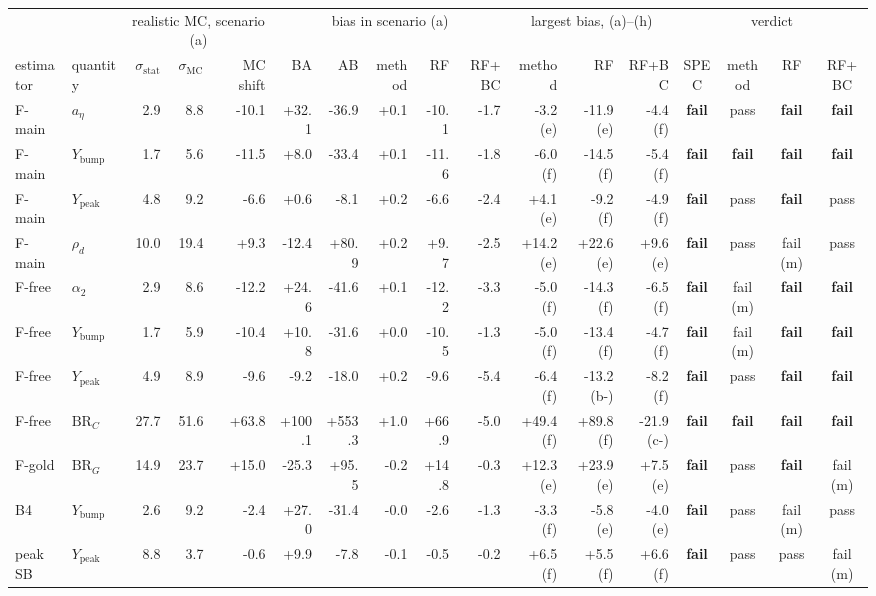 \begin{tabular}{llrrr|rrrrr|rrr|cccc}
\toprule
 & & \multicolumn{3}{c|}{realistic MC, scenario (a)} & \multicolumn{5}{c|}{bias in scenario (a)} & \multicolumn{3}{c|}{largest bias, (a)--(h)} & \multicolumn{4}{c}{verdict} \\
estimator & quantity & $\sigma_\mathrm{stat}$ & $\sigma_\mathrm{MC}$ & MC shift & BA & AB & method & RF & RF+BC & method & RF & RF+BC & SPEC & method & RF & RF+BC \\
\midrule
F-main & $a_\eta$ & 2.9 & 8.8 & -10.1 & +32.1 & -36.9 & +0.1 & -10.1 & -1.7 & -3.2 (e) & -11.9 (e) & -4.4 (f) & \textbf{fail} & pass & \textbf{fail} & \textbf{fail} \\
F-main & $Y_\mathrm{bump}$ & 1.7 & 5.6 & -11.5 & +8.0 & -33.4 & +0.1 & -11.6 & -1.8 & -6.0 (f) & -14.5 (f) & -5.4 (f) & \textbf{fail} & \textbf{fail} & \textbf{fail} & \textbf{fail} \\
F-main & $Y_\mathrm{peak}$ & 4.8 & 9.2 & -6.6 & +0.6 & -8.1 & +0.2 & -6.6 & -2.4 & +4.1 (e) & -9.2 (f) & -4.9 (f) & \textbf{fail} & pass & \textbf{fail} & pass \\
F-main & $\rho_d$ & 10.0 & 19.4 & +9.3 & -12.4 & +80.9 & +0.2 & +9.7 & -2.5 & +14.2 (e) & +22.6 (e) & +9.6 (e) & \textbf{fail} & pass & fail (m) & pass \\
F-free & $\alpha_2$ & 2.9 & 8.6 & -12.2 & +24.6 & -41.6 & +0.1 & -12.2 & -3.3 & -5.0 (f) & -14.3 (f) & -6.5 (f) & \textbf{fail} & fail (m) & \textbf{fail} & \textbf{fail} \\
F-free & $Y_\mathrm{bump}$ & 1.7 & 5.9 & -10.4 & +10.8 & -31.6 & +0.0 & -10.5 & -1.3 & -5.0 (f) & -13.4 (f) & -4.7 (f) & \textbf{fail} & fail (m) & \textbf{fail} & \textbf{fail} \\
F-free & $Y_\mathrm{peak}$ & 4.9 & 8.9 & -9.6 & -9.2 & -18.0 & +0.2 & -9.6 & -5.4 & -6.4 (f) & -13.2 (b-) & -8.2 (f) & \textbf{fail} & pass & \textbf{fail} & \textbf{fail} \\
F-free & $\mathrm{BR}_C$ & 27.7 & 51.6 & +63.8 & +100.1 & +553.3 & +1.0 & +66.9 & -5.0 & +49.4 (f) & +89.8 (f) & -21.9 (c-) & \textbf{fail} & \textbf{fail} & \textbf{fail} & \textbf{fail} \\
F-gold & $\mathrm{BR}_G$ & 14.9 & 23.7 & +15.0 & -25.3 & +95.5 & -0.2 & +14.8 & -0.3 & +12.3 (e) & +23.9 (e) & +7.5 (e) & \textbf{fail} & pass & \textbf{fail} & fail (m) \\
B4 & $Y_\mathrm{bump}$ & 2.6 & 9.2 & -2.4 & +27.0 & -31.4 & -0.0 & -2.6 & -1.3 & -3.3 (f) & -5.8 (e) & -4.0 (e) & \textbf{fail} & pass & fail (m) & pass \\
peak SB & $Y_\mathrm{peak}$ & 8.8 & 3.7 & -0.6 & +9.9 & -7.8 & -0.1 & -0.5 & -0.2 & +6.5 (f) & +5.5 (f) & +6.6 (f) & \textbf{fail} & pass & pass & fail (m) \\
\bottomrule
\end{tabular}
